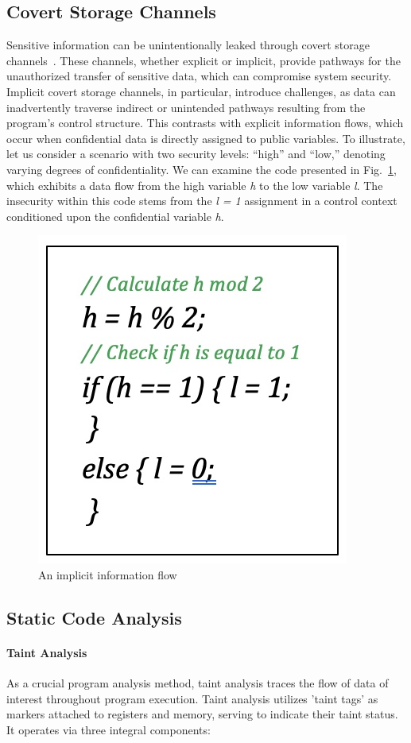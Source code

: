 \subsection{Covert Storage Channels}

Sensitive information can be unintentionally leaked through covert storage
channels~\cite{storagechannel, sabelfeld}. These channels, whether explicit
or implicit, provide pathways for the unauthorized transfer of sensitive
data, which can compromise system security. Implicit covert storage
channels, in particular, introduce challenges, as data can inadvertently
traverse indirect or unintended pathways resulting from the program's
control structure. This contrasts with explicit information flows, which
occur when confidential data is directly assigned to public variables. To
illustrate, let us consider a scenario with two security levels: ``high''
and ``low,'' denoting varying degrees of confidentiality. We can examine
the code presented in Fig.~\ref{fig:implicit}, which exhibits a data flow
from the high variable \textit{h} to the low variable \textit{l}. The
insecurity within this code stems from the \textit{l = 1} assignment in a
control context conditioned upon the confidential variable \textit{h}.

\begin{figure}
  \centering
  \includegraphics[width=.3\columnwidth]{figures/implicit.jpg}
  \caption{An implicit information flow}
  \label{fig:implicit}
\end{figure}

\subsection{Static Code Analysis}

\paragraph{\textbf{Taint Analysis}} As a crucial program analysis
method, taint analysis traces the flow of data of interest throughout
program execution. Taint analysis utilizes 'taint tags' as markers attached
to registers and memory, serving to indicate their taint status. It
operates via three integral components:

